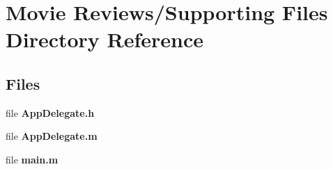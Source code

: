 \section{Movie Reviews/\+Supporting Files Directory Reference}
\label{dir_1df92afc4b6e3f7d224ed17ea426ea0d}
\subsection*{Files}
\begin{DoxyCompactItemize}
\item 
file {\bfseries App\+Delegate.\+h}
\item 
file {\bfseries App\+Delegate.\+m}
\item 
file {\bfseries main.\+m}
\end{DoxyCompactItemize}
